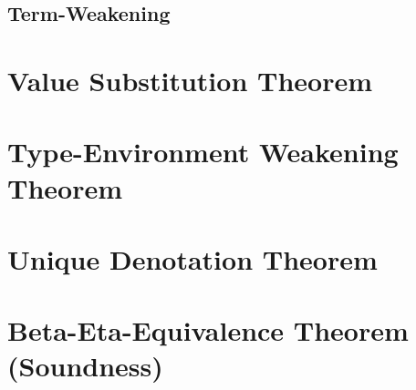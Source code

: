 \documentclass{report}
\begin{document}
\section{Term-Weakening}
\effectWeakeningTermWeakening

\chapter{Value Substitution Theorem}
\termSubstitution

\chapter{Type-Environment Weakening Theorem}
\termWeakening
    
\chapter{Unique Denotation Theorem}

\reductionExistence
\reductionDefinition

\chapter{Beta-Eta-Equivalence Theorem (Soundness)}
\soundnessproof
    
\end{document}
